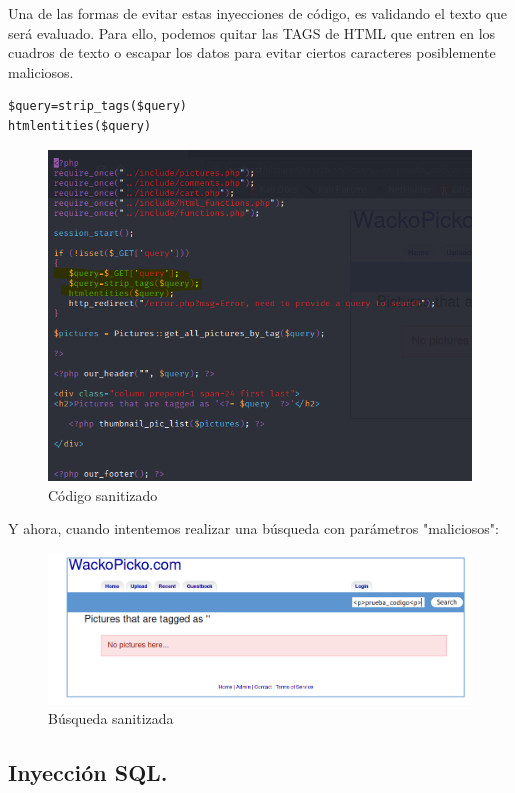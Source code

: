 \documentclass[12pt,twoside]{article}
\begin{document}
Una de las formas de evitar estas inyecciones de código, es validando el texto que será evaluado. Para ello, podemos quitar las TAGS de HTML que entren en los cuadros de texto o escapar los datos para evitar ciertos caracteres posiblemente maliciosos.
\begin{verbatim}
$query=strip_tags($query)
htmlentities($query)
\end{verbatim}
\begin{figure}[H]
    \centering
    \includegraphics[scale=0.5]{./imagenes/search_con_sanitizar}
    \caption{Código sanitizado}
\end{figure}
Y ahora, cuando intentemos realizar una búsqueda con parámetros "maliciosos":
\begin{figure}[H]
    \centering
    \includegraphics[scale=0.5]{./imagenes/search_web_sanitizado}
    \caption{Búsqueda sanitizada}
\end{figure}


\subsection{Inyección SQL.}
\end{document}
